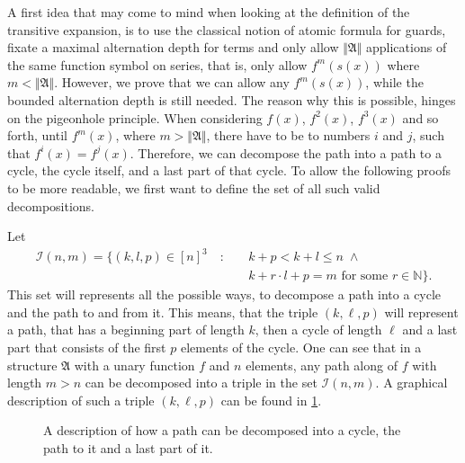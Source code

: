 \documentclass[a4paper,11pt,DIV=15]{scrartcl} %
\theoremstyle{plain}
\theoremstyle{definition}
\begin{document}
A first idea that may come to mind when looking at the definition of the transitive expansion, is to use the classical notion of atomic formula for guards, fixate a maximal alternation depth for terms and only allow $\Vert \mathfrak{A}\Vert$ applications of the same function symbol on series, that is, only allow $f^m(s(x))$ where $m<\Vert\mathfrak A\Vert$.
However, we prove that we can allow any $f^m(s(x))$, while the bounded alternation depth is still needed.
The reason why this is possible, hinges on the pigeonhole principle.
When considering $f(x)$, $f^2(x)$, $f^3(x)$ and so forth, until $f^m(x)$, where $m>\Vert\mathfrak A\Vert$, there have to be to numbers $i$ and $j$, such that $f^i(x)=f^j(x)$.
Therefore, we can decompose the path into a path to a cycle, the cycle itself, and a last part of that cycle.
To allow the following proofs to be more readable, we first want to define the set of all such valid decompositions.

Let 
\begin{align*}
\mathcal I(n,m)=\{(k,l,p)\in [n]^3 \quad:\quad & k+p < k+l \leq n \; \land \\
& k+r\cdot l + p = m \text{ for some } r\in \mathbb N\}.
\end{align*}
This set will represents all the possible ways, to decompose a path into a cycle and the path to and from it.
This means, that the triple $(k,\ell,p)$ will represent a path, that has a beginning part of length $k$, then a cycle of length $\ell$ and a last part that consists of the first $p$ elements of the cycle.
One can see that in a structure $\mathfrak A$ with a unary function $f$ and $n$ elements, any path along of $f$ with length $m>n$ can be decomposed into a triple in the set $\mathcal I(n,m)$.
A graphical description of such a triple $(k,\ell,p)$ can be found in \cref{PathDecompositionPrinciple}.

\begin{figure}[h]
	\centering
	
	\caption{A description of how a path can be decomposed into a cycle, the path to it and a last part of it.}
	\label{PathDecompositionPrinciple}
\end{figure}
\end{document}

